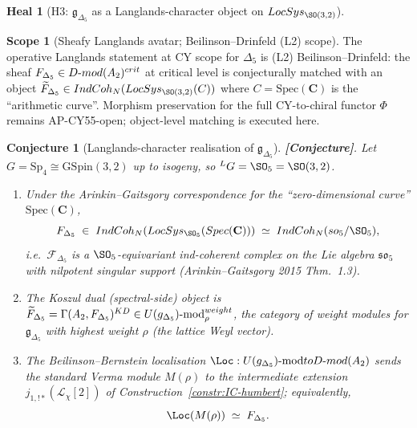 \documentclass[11pt]{amsart}
\newtheorem{conjecture}[theorem]{Conjecture}
\theoremstyle{definition}
\newtheorem{heal}[attack]{Heal}
\newtheorem{scope}[theorem]{Scope}
\providecommand{\IndCoh}{\mathrm{IndCoh}}
\providecommand{\DMod}{D\text{-}\mathrm{mod}}
\providecommand{\LocSys}{\mathrm{LocSys}}
\providecommand{\GSpin}{\mathrm{GSpin}}
\providecommand{\Sp}{\mathrm{Sp}}
\providecommand{\LG}{{}^L G}
\providecommand{\fso}{\mathfrak{so}}
\providecommand{\cL}{\mathcal{L}}
\providecommand{\cF}{\mathcal{F}}
\providecommand{\bC}{\mathbf{C}}
\providecommand{\Dfive}{\Delta_5}
\providecommand{\gDfive}{\mathfrak{g}_{\Dfive}}
\providecommand{\ClaimStatusConjectured}{\textbf{[Conjecture]}}
\begin{document}
\begin{heal}[H3: $\gDfive$ as a Langlands-character object on
$\LocSys_{\SO(3,2)}$]\leavevmode

\begin{scope}[Sheafy Langlands avatar; Beilinson--Drinfeld
(L2) scope]\label{scope:langlands-l2}
The operative Langlands statement at CY scope for $\Dfive$ is (L2)
Beilinson--Drinfeld: the sheaf $\cF_{\Dfive} \in
\DMod(\mathcal{A}_2)^{\rm crit}$ at critical level is conjecturally
matched with an object
$\widetilde{\cF}_{\Dfive} \in \IndCoh_{\cN}(\LocSys_{\SO(3,2)}(C))$
where $C = \mathrm{Spec}(\bC)$ is the ``arithmetic curve''. Morphism
preservation for the full CY-to-chiral functor $\Phi$ remains
AP-CY55-open; object-level matching is executed here.
\end{scope}

\begin{conjecture}[Langlands-character realisation of $\gDfive$]
\label{conj:langlands-character-gDfive}
\ClaimStatusConjectured.
Let $G = \Sp_4 \cong \GSpin(3,2)$ up to isogeny, so $\LG = \SO_5 =
\SO(3,2)$.
\begin{enumerate}[label=(\alph*)]
\item Under the Arinkin--Gaitsgory correspondence for the
``zero-dimensional curve'' $\mathrm{Spec}(\bC)$,
\[
 \cF_{\Dfive} \;\in\; \IndCoh_{\cN}(\LocSys_{\SO_5}(\mathrm{Spec}(\bC)))
 \;\simeq\; \IndCoh_{\cN}(\fso_5 / \SO_5),
\]
i.e.\ $\cF_{\Dfive}$ is a $\SO_5$-equivariant ind-coherent complex
on the Lie algebra $\fso_5$ with nilpotent singular support
(Arinkin--Gaitsgory 2015 Thm.~1.3).
\item The Koszul dual (spectral-side) object is
$\widetilde{\cF}_{\Dfive} = \Gamma(\mathcal{A}_2, \cF_{\Dfive})^{\rm KD}
\in U(\gDfive)\text{-mod}^{\rm weight}_{\rho}$, the category of
weight modules for $\gDfive$ with highest weight $\rho$ (the lattice
Weyl vector).
\item The Beilinson--Bernstein localisation
$\Loc \colon U(\gDfive)\text{-mod} \to \DMod(\mathcal{A}_2)$
sends the standard Verma module
$M(\rho)$ to the intermediate extension $j_{1,!*}(\cL_\chi[2])$ of
Construction~\ref{constr:IC-humbert}; equivalently,
\[
 \Loc(M(\rho)) \;\simeq\; \cF_{\Dfive}.
\]
\end{enumerate}
\end{conjecture}


\end{heal}
\end{document}
